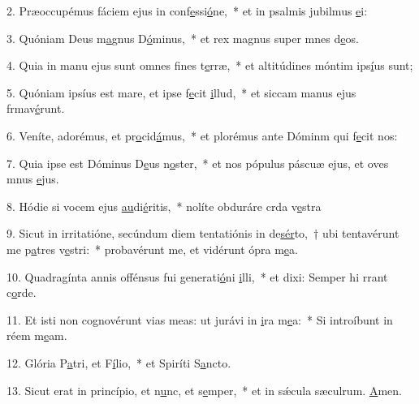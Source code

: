 2. Præoccupémus fáciem ejus in conf\uline{e}ssi\uline{ó}ne,~* et in psalmis jubilmus \uline{e}i:\par 
3. Quóniam Deus m\uline{a}gnus D\uline{ó}minus,~* et rex magnus super mnes d\uline{e}os.\par 
4. Quia in manu ejus sunt omnes f\uline{i}nes t\uline{e}rræ,~* et altitúdines móntim ips\uline{í}us sunt;\par 
5. Quóniam ipsíus est mare, et ipse f\uline{e}cit \uline{i}llud,~* et siccam manus ejus frmav\uline{é}runt.\par 
6. Veníte, adorémus, et pr\uline{o}cid\uline{á}mus,~* et plorémus ante Dóminm qui f\uline{e}cit nos:\par 
7. Quia ipse est Dóminus D\uline{e}us n\uline{o}ster,~* et nos pópulus páscuæ ejus, et oves mnus \uline{e}jus.\par 
8. Hódie si vocem ejus \uline{au}di\uline{é}ritis,~* nolíte obduráre crda v\uline{e}stra\par 
9. Sicut in irritatióne, secúndum diem tentatiónis in de\uline{sér}to,~† ubi tentavérunt me p\uline{a}tres v\uline{e}stri:~* probavérunt me, et vidérunt ópra m\uline{e}a.\par 
10. Quadragínta annis offénsus fui generati\uline{ó}ni \uline{i}lli,~* et dixi: Semper hi rrant c\uline{o}rde.\par 
11. Et isti non cognovérunt vias meas: ut jurávi in \uline{i}ra m\uline{e}a:~* Si introíbunt in réem m\uline{e}am.\par 
12. Glória P\uline{a}tri, et F\uline{í}lio,~* et Spiríti S\uline{a}ncto.\par 
13. Sicut erat in princípio, et n\uline{u}nc, et s\uline{e}mper,~* et in sǽcula sæculrum. \uline{A}men.\par 
